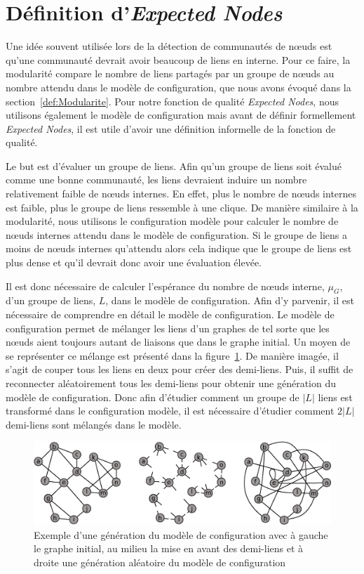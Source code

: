 \section{Définition d'\emph{Expected Nodes}}

Une idée souvent utilisée lors de la détection de communautés de n\oe uds est qu'une communauté devrait avoir beaucoup de liens en interne.
Pour ce faire, la modularité compare le nombre de liens partagés par un groupe de n\oe uds au nombre attendu dans le modèle de configuration, que nous avons évoqué dans la section~\ref{def:Modularite}.
Pour notre fonction de qualité \emph{Expected Nodes}, nous utilisons également le modèle de configuration mais avant de définir formellement \emph{Expected Nodes}, il est utile d'avoir une définition informelle de la fonction de qualité.

Le but est d'évaluer un groupe de liens.
Afin qu'un groupe de liens soit évalué comme une bonne communauté, les liens devraient induire un nombre relativement faible de n\oe uds internes.
En effet, plus le nombre de n\oe uds internes est faible, plus le groupe de liens ressemble à une clique.
De manière similaire à la modularité, nous utilisons le configuration modèle pour calculer le nombre de n\oe uds internes attendu dans le modèle de configuration.
Si le groupe de liens a moins de n\oe uds internes qu'attendu alors cela indique que le groupe de liens est plus dense et qu'il devrait donc avoir une évaluation élevée.


Il est donc nécessaire de calculer l'espérance du nombre de n\oe uds interne, $\mu_{G}$, d'un groupe de liens, $L$, dans le modèle de configuration.
Afin d'y parvenir, il est nécessaire de comprendre en détail le modèle de configuration.
Le modèle de configuration permet de mélanger les liens d'un graphes de tel sorte que les n\oe uds aient toujours autant de liaisons que dans le graphe initial.
Un moyen de se représenter ce mélange est présenté dans la figure~\ref{fig:exemple_modele_configuration}.
De manière imagée, il s'agit de couper tous les liens en deux pour créer des demi-liens.
Puis, il suffit de reconnecter aléatoirement tous les demi-liens pour obtenir une génération du modèle de configuration.
Donc afin d'étudier comment un groupe de $|L|$ liens est transformé dans le configuration modèle, il est nécessaire d'étudier comment $2|L|$ demi-liens sont mélangés dans le modèle.

\begin{figure}
\centering
\includegraphics[width=0.8\linewidth]{img/ExpectedNodes/Example/modele_configuration.eps}
\caption{Exemple d'une génération du modèle de configuration avec à gauche le graphe initial, au milieu la mise en avant des demi-liens et à droite une génération aléatoire du modèle de configuration}
\label{fig:exemple_modele_configuration}
\end{figure}


